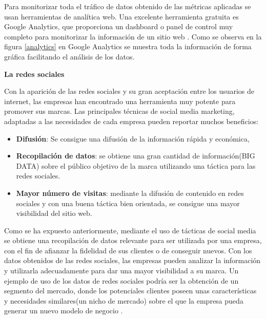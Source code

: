 Para monitorizar toda el tráfico de datos obtenido de las métricas aplicadas se usan herramientas de analítica web. Una excelente herramienta gratuita es Google Analytics, que proporciona un dashboard o panel de control muy completo para monitorizar la información de un sitio web \cite{analytics}. Como se observa en la figura \ref{analytics} en Google Analytics se muestra toda la información de forma gráfica facilitando el análisis de los datos.

\vspace{5 mm}

\textbf{La redes sociales}

\vspace{5 mm}

Con la aparición de las redes sociales y su gran aceptación entre los usuarios de internet, las empresas han encontrado una herramienta muy potente para promover sus marcas. Las principales técnicas de social media marketing, adaptadas a las necesidades de cada empresa  pueden reportar muchos beneficios:

\begin{itemize}

\item \textbf{Difusión}: Se consigue una difusión de la información rápida y económica,

\item \textbf{Recopilación de datos}: se obtiene una gran cantidad de información(BIG DATA) sobre el público objetivo de la marca utilizando una táctica para las redes sociales.

\item \textbf{Mayor número de visitas}: mediante la difusión de contenido en redes sociales y con una buena táctica bien orientada, se consigue una mayor visibilidad del sitio web.

\end{itemize}

Como se ha expuesto anteriormente, mediante el uso de tácticas de social media se obtiene una recopilación de datos relevante para ser utilizada por una empresa, con el fin de afianzar la fidelidad de sus clientes o de conseguir nuevos. Con los datos obtenidos de las redes sociales, las empresas pueden analizar la información y utilizarla adecuadamente para dar una mayor visibilidad a su marca. Un ejemplo de uso de los datos de redes sociales podría ser la obtención de un segmento del mercado, donde los potenciales clientes poseen unas características y necesidades similares(un nicho de mercado) sobre el que la empresa pueda generar un nuevo modelo de negocio \cite{social-media-marketing}.


